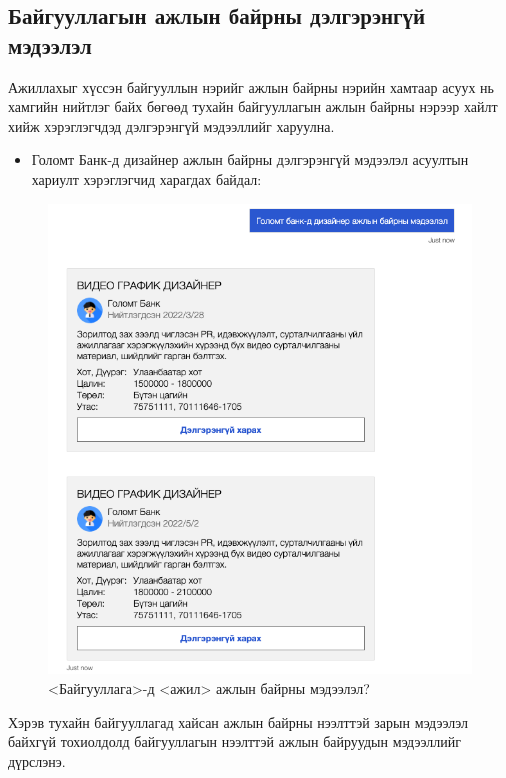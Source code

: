 \subsection{Байгууллагын ажлын байрны дэлгэрэнгүй мэдээлэл}
Ажиллахыг хүссэн байгууллын нэрийг ажлын байрны нэрийн хамтаар асуух нь хамгийн нийтлэг байх бөгөөд тухайн байгууллагын ажлын байрны нэрээр хайлт хийж хэрэглэгчдэд дэлгэрэнгүй мэдээллийг харуулна. 
\begin{itemize}
  \item Голомт Банк-д дизайнер ажлын байрны дэлгэрэнгүй мэдээлэл асуултын хариулт хэрэглэгчид харагдах байдал:
\end{itemize}
\begin{figure}[ht]
  \centering
  \includegraphics[width=\textwidth-4cm]{images/question1.png}
  \caption{<Байгууллага>-д <ажил> ажлын байрны мэдээлэл?}\label{fig:quest1}
\end{figure}
Хэрэв тухайн байгууллагад хайсан ажлын байрны нээлттэй зарын мэдээлэл байхгүй тохиолдолд байгууллагын нээлттэй ажлын байруудын мэдээллийг дүрслэнэ.
